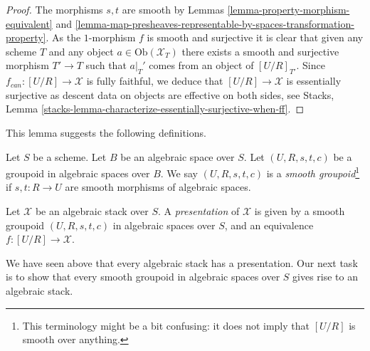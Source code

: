 \begin{proof}
The morphisms $s, t$ are smooth by
Lemmas \ref{lemma-property-morphism-equivalent} and
\ref{lemma-map-presheaves-representable-by-spaces-transformation-property}.
As the $1$-morphism $f$ is smooth and
surjective it is clear that given any scheme $T$ and any object
$a \in \text{Ob}(\mathcal{X}_T)$ there exists a smooth and surjective
morphism $T' \to T$ such that $a|_T'$ comes from an object of
$[U/R]_{T'}$. Since $f_{can} : [U/R] \to \mathcal{X}$
is fully faithful, we deduce that
$[U/R] \to \mathcal{X}$ is essentially surjective as
descent data on objects are effective on both sides, see
Stacks, Lemma \ref{stacks-lemma-characterize-essentially-surjective-when-ff}.
\end{proof}

\noindent
This lemma suggests the following definitions.

\begin{definition}
\label{definition-smooth-groupoid}
Let $S$ be a scheme. Let $B$ be an algebraic space over $S$.
Let $(U, R, s, t, c)$ be a groupoid in algebraic spaces over $B$.
We say $(U, R, s, t, c)$ is a {\it smooth groupoid}\footnote{This terminology
might be a bit confusing: it does not imply that $[U/R]$ is smooth
over anything.}
if $s, t : R \to U$ are smooth morphisms of algebraic spaces.
\end{definition}

\begin{definition}
\label{definition-presentation}
Let $\mathcal{X}$ be an algebraic stack over $S$.
A {\it presentation} of $\mathcal{X}$ is given by a smooth groupoid
$(U, R, s, t, c)$ in algebraic spaces over $S$, and an
equivalence $f : [U/R] \to \mathcal{X}$.
\end{definition}

\noindent
We have seen above that every algebraic stack has a presentation.
Our next task is to show that every smooth groupoid in algebraic
spaces over $S$ gives rise to an algebraic stack.










